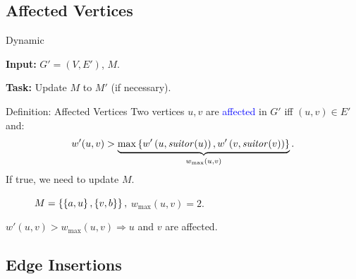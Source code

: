 \documentclass[10pt,titlepage,english,presentation]{beamer}
\renewenvironment{definition}[1]{\begin{block}{\vspace{-.5mm}\small Definition: #1}}{\end{block}}
\newcommand{\wmaxuv}{\ensuremath{w_{\max}(u, v)}}
\newcommand{\emphcolor}{blue}
\renewcommand{\emph}[1]{\textcolor{\emphcolor}{#1}}
\begin{document}
\subsection{Affected Vertices}
\begin{frame}{Dynamic \suitor}
\small

\textbf{Input:} $G' = (V, E')$, $M$.\smallskip

    \textbf{Task:} Update $M$ to $M'$ (if necessary).
\smallskip

\begin{definition}{Affected Vertices}
Two vertices $u,v$ are \emph{affected} in $G'$ iff $(u, v) \in E'$ and:
\[
w'(u, v) > \underbrace{\max\set{w'\roundb{u, \vsuitor(u)},w'\roundb{v, \vsuitor(v)}}}_{\wmaxuv}.
\]
If true, we need to update $M$.
\end{definition}
\medskip

\begin{figure}
\centering
\caption*{$M = \left\lbrace\left\lbrace a, u\right\rbrace, \left\lbrace v, b\right\rbrace\right\rbrace,$ $\wmaxuv = 2$.}

\end{figure}
\centering
$w'(u, v) > \wmaxuv \Rightarrow u$ and $v$ are affected.
%
%
%
%
%
%
%
\end{frame}


\subsection{Edge Insertions}
\end{document}
